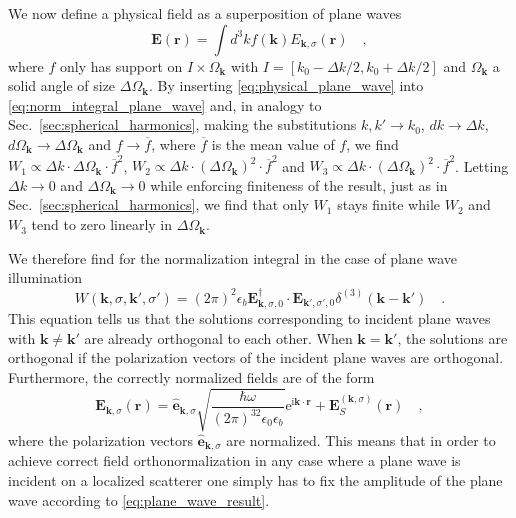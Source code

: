 \documentclass[10pt,letterpaper]{article}
\newcommand{\ii}{\text{i}}
\newcommand{\ee}{\text{e}}
\renewcommand{\vec}[1]{\mathbf{#1}}
\let\oldhat\hat
\renewcommand{\hat}[1]{\oldhat{\vec{#1}}}
\begin{document}
We now define a physical field as a superposition of plane waves
\begin{equation}
\vec{E}(\vec{r}) = \int d^3k f(\vec{k}) E_{\vec{k},\sigma}(\vec{r}) \quad , \label{eq:physical_plane_wave}
\end{equation}
where $f$ only has support on $I \times \Omega_{\vec{k}}$ with $I = [k_0-\Delta k/2, k_0+\Delta k/2]$ and $\Omega_{\vec{k}}$ a solid angle of size $\Delta\Omega_{\vec{k}}$. By inserting \eqref{eq:physical_plane_wave} into \eqref{eq:norm_integral_plane_wave} and, in analogy to Sec.~\ref{sec:spherical_harmonics}, making the substitutions $k,k' \rightarrow k_0$, $dk \rightarrow \Delta k$, $d\Omega_{\vec{k}} \rightarrow \Delta \Omega_{\vec{k}}$ and $f \rightarrow \overline{f}$, where $\overline{f}$ is the mean value of $f$, we find $W_1 \propto \Delta k \cdot \Delta \Omega_{\vec{k}} \cdot \overline{f}^2$, $W_2 \propto \Delta k \cdot \left(\Delta \Omega_{\vec{k}}\right)^2 \cdot \overline{f}^2$ and $W_3 \propto \Delta k \cdot \left(\Delta \Omega_{\vec{k}}\right)^2 \cdot \overline{f}^2$. Letting $\Delta k \rightarrow 0$ and $\Delta\Omega_{\vec{k}} \rightarrow 0$ while enforcing finiteness of the result, just as in Sec.~\ref{sec:spherical_harmonics}, we find that only $W_1$ stays finite while $W_2$ and $W_3$ tend to zero linearly in $\Delta \Omega_{\vec{k}}$.

We therefore find for the normalization integral in the case of plane wave illumination
\begin{equation}
W(\vec{k},\sigma,\vec{k'},\sigma') = (2\pi)^2\epsilon_b\vec{E}^{\dagger}_{\vec{k},\sigma,0}\cdot\vec{E}_{\vec{k'},\sigma',0} \delta^{(3)}(\vec{k}-\vec{k'}) \quad .
\end{equation}
This equation tells us that the solutions corresponding to incident plane waves with $\vec{k}\neq\vec{k'}$ are already orthogonal to each other. When $\vec{k}=\vec{k'}$, the solutions are orthogonal if the polarization vectors of the incident plane waves are orthogonal. Furthermore, the correctly normalized fields are of the form
\begin{equation} \label{eq:plane_wave_result}
\vec{E}_{\vec{k},\sigma}(\vec{r}) = \hat{e}_{\vec{k},\sigma} \sqrt{\frac{\hbar\omega}{(2\pi)^32\epsilon_0\epsilon_b}} \ee^{\ii\vec{k}\cdot\vec{r}} + \vec{E}^{(\vec{k},\sigma)}_{S}(\vec{r}) \quad ,
\end{equation}
where the polarization vectors $\hat{e}_{\vec{k},\sigma}$ are normalized. This means that in order to achieve correct field orthonormalization in any case where a plane wave is incident on a localized scatterer one simply has to fix the amplitude of the plane wave according to \eqref{eq:plane_wave_result}.
\end{document}
